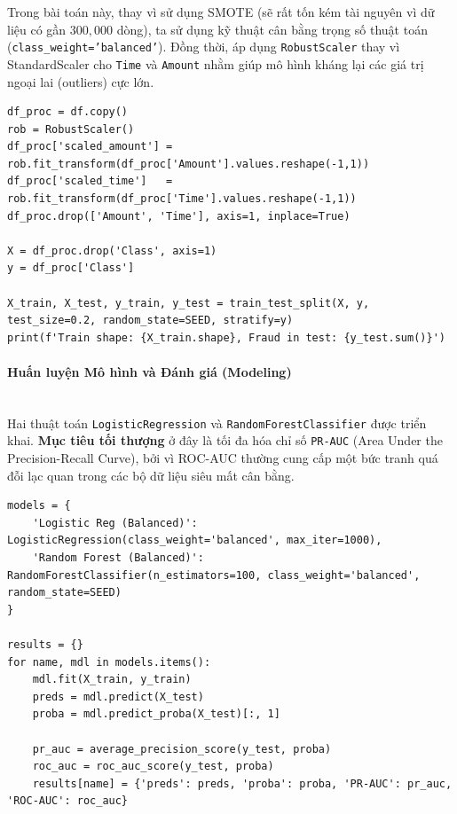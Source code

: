Trong bài toán này, thay vì sử dụng SMOTE (sẽ rất tốn kém tài nguyên vì dữ liệu có gần $300,000$ dòng), ta sử dụng kỹ thuật cân bằng trọng số thuật toán (\texttt{class\_weight='balanced'}). Đồng thời, áp dụng \texttt{RobustScaler} thay vì StandardScaler cho \texttt{Time} và \texttt{Amount} nhằm giúp mô hình kháng lại các giá trị ngoại lai (outliers) cực lớn.

\begin{lstlisting}[style=pythoncode, caption={Data preprocessing with RobustScaler and train-test split}]
df_proc = df.copy()
rob = RobustScaler()
df_proc['scaled_amount'] = rob.fit_transform(df_proc['Amount'].values.reshape(-1,1))
df_proc['scaled_time']   = rob.fit_transform(df_proc['Time'].values.reshape(-1,1))
df_proc.drop(['Amount', 'Time'], axis=1, inplace=True)

X = df_proc.drop('Class', axis=1)
y = df_proc['Class']

X_train, X_test, y_train, y_test = train_test_split(X, y, test_size=0.2, random_state=SEED, stratify=y)
print(f'Train shape: {X_train.shape}, Fraud in test: {y_test.sum()}')
\end{lstlisting}

\paragraph{Huấn luyện Mô hình và Đánh giá (Modeling)} \hfill \\

Hai thuật toán \texttt{LogisticRegression} và \texttt{RandomForestClassifier} được triển khai. \textbf{Mục tiêu tối thượng} ở đây là tối đa hóa chỉ số \texttt{PR-AUC} (Area Under the Precision-Recall Curve), bởi vì ROC-AUC thường cung cấp một bức tranh quá đỗi lạc quan trong các bộ dữ liệu siêu mất cân bằng.

\begin{lstlisting}[style=pythoncode, caption={Train cost-sensitive models and calculate PR-AUC scores}]
models = {
    'Logistic Reg (Balanced)': LogisticRegression(class_weight='balanced', max_iter=1000),
    'Random Forest (Balanced)': RandomForestClassifier(n_estimators=100, class_weight='balanced', random_state=SEED)
}

results = {}
for name, mdl in models.items():
    mdl.fit(X_train, y_train)
    preds = mdl.predict(X_test)
    proba = mdl.predict_proba(X_test)[:, 1]
    
    pr_auc = average_precision_score(y_test, proba)
    roc_auc = roc_auc_score(y_test, proba)
    results[name] = {'preds': preds, 'proba': proba, 'PR-AUC': pr_auc, 'ROC-AUC': roc_auc}
\end{lstlisting}

